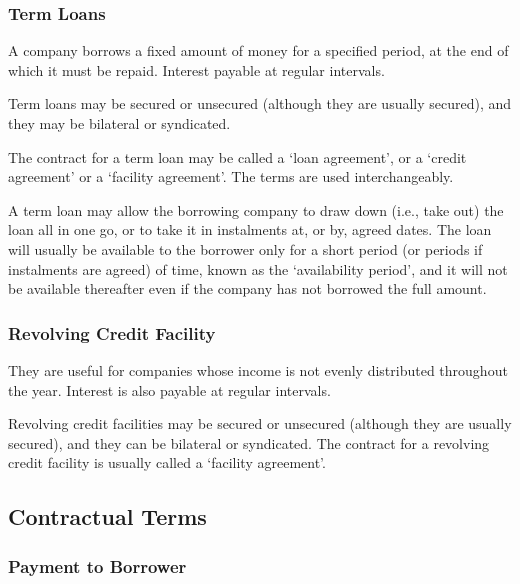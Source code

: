 \documentclass[
]{article}
\begin{document}
\hypertarget{term-loans}{%
\subsubsection{Term Loans}\label{term-loans}}

A company borrows a fixed amount of money for a specified period, at the
end of which it must be repaid. Interest payable at regular intervals.

Term loans may be secured or unsecured (although they are usually
secured), and they may be bilateral or syndicated.

The contract for a term loan may be called a `loan agreement', or a
`credit agreement' or a `facility agreement'. The terms are used
interchangeably.

A term loan may allow the borrowing company to draw down (i.e., take
out) the loan all in one go, or to take it in instalments at, or by,
agreed dates. The loan will usually be available to the borrower only
for a short period (or periods if\\
instalments are agreed) of time, known as the `availability period', and
it will not be available thereafter even if the company has not borrowed
the full amount.

\hypertarget{revolving-credit-facility}{%
\subsubsection{Revolving Credit
Facility}\label{revolving-credit-facility}}

They are useful for companies whose income is not evenly distributed
throughout the year. Interest is also payable at regular intervals.

Revolving credit facilities may be secured or unsecured (although they
are usually secured), and they can be bilateral or syndicated. The
contract for a revolving credit facility is usually called a `facility
agreement'.

\hypertarget{contractual-terms}{%
\subsection{Contractual Terms}\label{contractual-terms}}

\hypertarget{payment-to-borrower}{%
\subsubsection{Payment to Borrower}\label{payment-to-borrower}}
\end{document}

